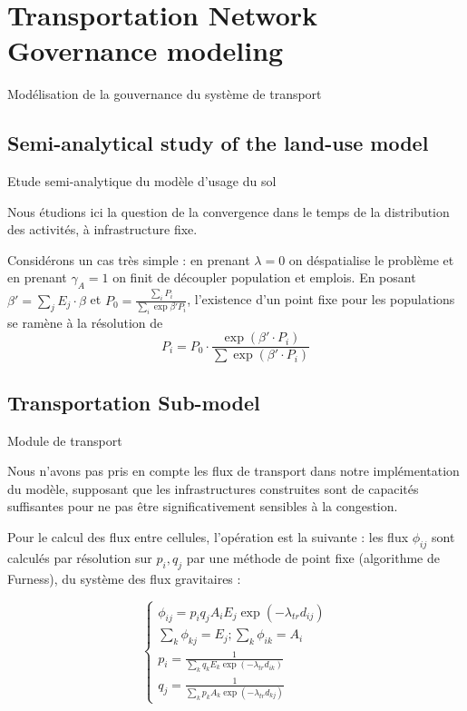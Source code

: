 
\newpage

\section{Transportation Network Governance modeling}{Modélisation de la gouvernance du système de transport}

\label{app:sec:lutecia}


\subsection{Semi-analytical study of the land-use model}{Etude semi-analytique du modèle d'usage du sol}

\cite{leurent2014user}

Nous étudions ici la question de la convergence dans le temps de la distribution des activités, à infrastructure fixe.

Considérons un cas très simple : en prenant $\lambda = 0$ on déspatialise le problème et en prenant $\gamma_A = 1$ on finit de découpler population et emplois. En posant $\beta' = \sum_j E_j \cdot \beta$ et $P_0 = \frac{\sum_i P_i}{\sum_i \exp \beta' P_i}$, l'existence d'un point fixe pour les populations se ramène à la résolution de
\[
P_i = P_0 \cdot \frac{\exp\left(\beta' \cdot P_i\right)}{\sum \exp\left(\beta' \cdot P_i\right)}
\]



\subsection{Transportation Sub-model}{Module de transport}

Nous n'avons pas pris en compte les flux de transport dans notre implémentation du modèle, supposant que les infrastructures construites sont de capacités suffisantes pour ne pas être significativement sensibles à la congestion.


Pour le calcul des flux entre cellules, l'opération est la suivante : les flux $\phi_{ij}$ sont calculés par résolution sur $p_i,q_j$ par une méthode de point fixe (algorithme de Furness), du système des flux gravitaires :


\[
\begin{cases}
\phi_{ij} = p_i q_j A_i E_j \exp{\left(-\lambda_{tr} d_{ij}\right)}\\
\sum_k \phi_{kj} = E_j ; \sum_k \phi_{ik} = A_i\\
p_i = \frac{1}{\sum_k{q_k E_k \exp{(-\lambda_{tr}d_{ik})}}}\\
q_j = \frac{1}{\sum_k{p_k A_k \exp{(-\lambda_{tr}d_{kj})}}} 
\end{cases}
\]

